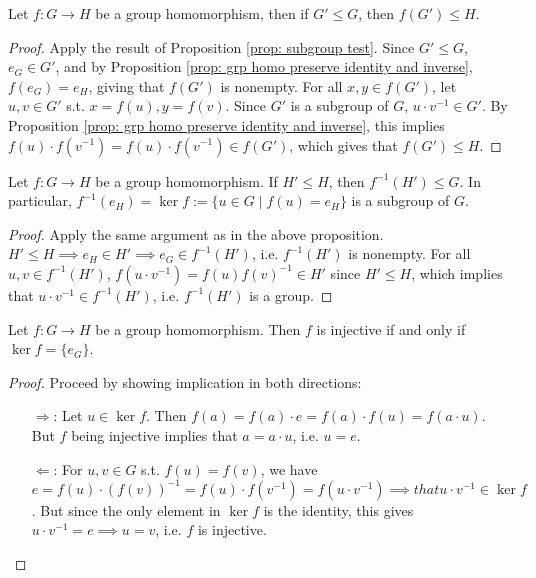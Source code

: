 \documentclass{article}
\begin{document}
\begin{proposition}
    Let $f: G \to H$ be a group homomorphism, then if $G' \leq G$, then $f(G') \leq H$.
\end{proposition}

\begin{proof}
    Apply the result of Proposition \ref{prop: subgroup test}. Since $G' \leq G$, $e_G \in G'$, and by Proposition \ref{prop: grp homo preserve identity and inverse}, $f(e_G) = e_H$, giving that $f(G')$ is nonempty. For all $x, y \in f(G')$, let $u, v \in G'$ s.t. $x = f(u), y = f(v)$. Since $G'$ is a subgroup of $G$, $u\cdot v^{-1} \in G'$. By Proposition \ref{prop: grp homo preserve identity and inverse}, this implies $f(u) \cdot f(v^{-1}) = f(u) \cdot f(v^{-1}) \in f(G')$, which gives that $f(G') \leq H$.
\end{proof}

\begin{proposition}\label{prop: kernel gives a subgroup}
    Let $f: G \to H$ be a group homomorphism. If $H' \leq H$, then $f^{-1} (H') \leq G$. In particular, $f^{-1}(e_H) = \ker f := \{u \in G \mid f(u) = e_H\}$ is a subgroup of $G$.
\end{proposition}

\begin{proof}
    Apply the same argument as in the above proposition. $H' \leq H \implies e_H \in H' \implies e_G \in f^{-1}(H')$, i.e. $f^{-1}(H')$ is nonempty. For all $u, v \in f^{-1}(H')$, $f(u\cdot v^{-1}) = f(u) f(v)^{-1} \in H'$ since $H' \leq H$, which implies that $u \cdot v^{-1} \in f^{-1}(H')$, i.e. $f^{-1}(H')$ is a group. 
\end{proof}

\begin{proposition}
    Let $f: G \to H$ be a group homomorphism. Then $f$ is injective if and only if $\ker f = \{e_G\}$.
\end{proposition}

\begin{proof}
    Proceed by showing implication in both directions:
    \begin{enumerate}
        \item[$\Rightarrow$:] Let $u \in \ker f$. Then $f(a) = f(a) \cdot e = f(a) \cdot f(u) = f(a \cdot u)$. But $f$ being injective implies that $a = a\cdot u$, i.e. $u = e$.
        \item[$\Leftarrow$:] For $u, v \in G$ s.t. $f(u) = f(v)$, we have $e = f(u) \cdot (f(v))^{-1} = f(u) \cdot f(v^{-1}) = f(u \cdot v^{-1}) \implies that u \cdot v^{-1} \in \ker f$. But since the only element in $\ker f$ is the identity, this gives $u \cdot v^{-1} = e \implies u = v$, i.e. $f$ is injective.
    \end{enumerate}
\end{proof}
\end{document}
